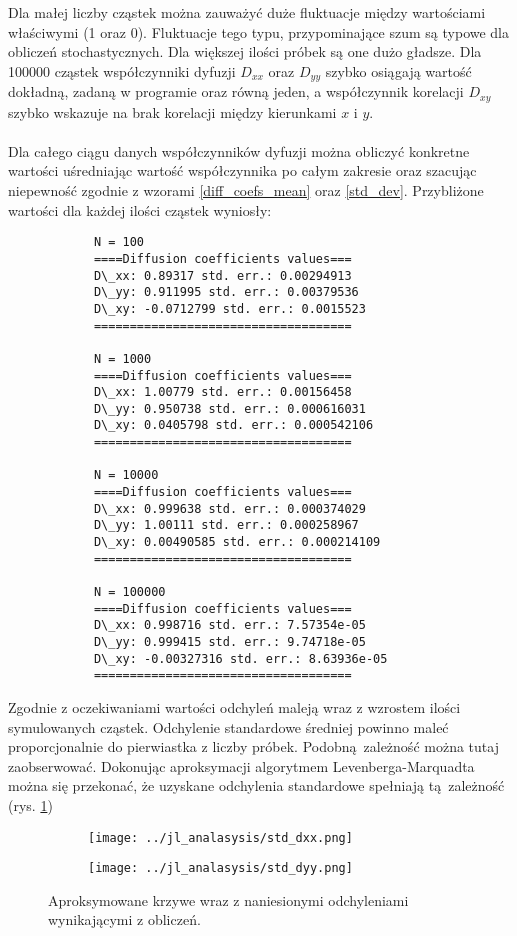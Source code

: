 \documentclass[a4paper, 12pt]{article}
\begin{document}
\noaka Dla małej liczby cząstek można zauważyć duże fluktuacje między wartościami właściwymi (1 oraz 0).
Fluktuacje tego typu, przypominające szum są typowe dla obliczeń stochastycznych. 
Dla większej ilości próbek są one dużo gładsze.
Dla 100000 cząstek współczynniki dyfuzji $D_{xx}$ oraz $D_{yy}$ szybko osiągają wartość dokładną, zadaną w programie oraz równą jeden, a współczynnik korelacji $D_{xy}$ szybko wskazuje na brak korelacji między kierunkami $x$ i $y$.
\\
\\
Dla całego ciągu danych współczynników dyfuzji można obliczyć konkretne wartości uśredniając wartość współczynnika po całym zakresie oraz szacując niepewność zgodnie z wzorami \eqref{diff_coefs_mean} oraz \eqref{std_dev}.
Przybliżone wartości dla każdej ilości cząstek wyniosły:
\begin{verbatim}
			N = 100
			====Diffusion coefficients values===
			D\_xx: 0.89317 std. err.: 0.00294913
			D\_yy: 0.911995 std. err.: 0.00379536
			D\_xy: -0.0712799 std. err.: 0.0015523
			====================================
			
			N = 1000
			====Diffusion coefficients values===
			D\_xx: 1.00779 std. err.: 0.00156458
			D\_yy: 0.950738 std. err.: 0.000616031
			D\_xy: 0.0405798 std. err.: 0.000542106
			====================================
			
			N = 10000
			====Diffusion coefficients values===
			D\_xx: 0.999638 std. err.: 0.000374029
			D\_yy: 1.00111 std. err.: 0.000258967
			D\_xy: 0.00490585 std. err.: 0.000214109
			====================================
			
			N = 100000
			====Diffusion coefficients values===
			D\_xx: 0.998716 std. err.: 7.57354e-05
			D\_yy: 0.999415 std. err.: 9.74718e-05
			D\_xy: -0.00327316 std. err.: 8.63936e-05
			====================================
\end{verbatim} 
Zgodnie z oczekiwaniami wartości odchyleń maleją wraz z wzrostem ilości symulowanych cząstek.  Odchylenie standardowe średniej powinno maleć proporcjonalnie do pierwiastka z liczby próbek. Podobną zależność można tutaj zaobserwować. Dokonując aproksymacji algorytmem Levenberga-Marquadta można się przekonać, że uzyskane odchylenia standardowe spełniają tą zależność (rys. \ref{fit})
	
\begin{figure}[h]
	\begin{subfigure}{0.49\textwidth}
		\centering
		\texttt{[image: ../jl\_analasysis/std\_dxx.png]}
		\caption{}
	\end{subfigure}
	\begin{subfigure}{0.49\textwidth}
		\centering
		\texttt{[image: ../jl\_analasysis/std\_dyy.png]}
		\caption{}
	\end{subfigure}
	\caption{Aproksymowane krzywe wraz z naniesionymi odchyleniami wynikającymi z obliczeń.}
	\label{fit}
\end{figure}
\end{document}
